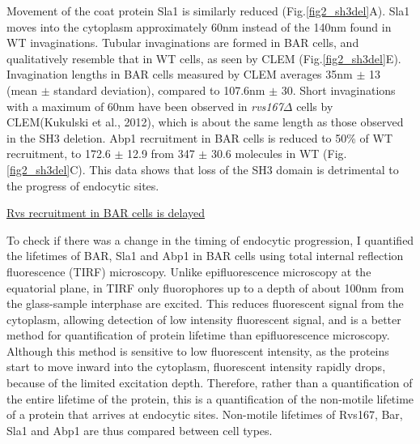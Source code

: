 Movement of the coat protein Sla1 is similarly reduced (Fig.\ref{fig2_sh3del}A). Sla1 moves into the cytoplasm approximately 60nm instead of the 140nm found in WT invaginations. Tubular invaginations are formed in BAR cells, and qualitatively resemble that in WT cells, as seen by CLEM  (Fig.\ref{fig2_sh3del}E). Invagination lengths in BAR cells measured by CLEM averages 35nm $\pm$ 13 (mean $\pm$ standard deviation), compared to 107.6nm $\pm$ 30. Short invaginations with a maximum of 60nm have been observed in  \textit{rvs167$\Delta$} cells  by CLEM(Kukulski et al., 2012), which is about the same length as those observed in the SH3 deletion. 
Abp1 recruitment in BAR cells is reduced to 50\% of WT recruitment, to 172.6 $\pm$ 12.9 from 347 $\pm$ 30.6 molecules in WT (Fig.\ref{fig2_sh3del}C). This data shows that loss of the SH3 domain is detrimental to the progress of endocytic sites. 


	\vspace{5mm}
		\underline{Rvs recruitment in BAR cells is delayed}
		
To check if there was a change in the timing of endocytic progression, I quantified the lifetimes of BAR, Sla1 and Abp1 in BAR cells using total internal reflection fluorescence (TIRF) microscopy. Unlike epifluorescence microscopy at the equatorial plane, in TIRF only fluorophores up to a depth of about 100nm from the glass-sample interphase are excited. This reduces fluorescent signal from the cytoplasm, allowing detection of low intensity fluorescent signal, and is a better method for quantification of protein lifetime than epifluorescence microscopy. Although this method is sensitive to low fluorescent intensity, as the proteins start to move inward into the cytoplasm, fluorescent intensity rapidly drops, because of the limited excitation depth. Therefore, rather than a quantification of the entire lifetime of the protein, this is a quantification of the non-motile lifetime of a protein that arrives at endocytic sites. Non-motile lifetimes of Rvs167, Bar, Sla1 and Abp1 are thus compared between cell types. 




